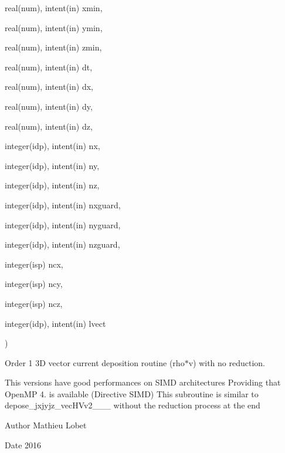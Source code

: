 {\begin{DoxyParamCaption}
\item[{real(num), intent(in)}]{xmin, }
\item[{real(num), intent(in)}]{ymin, }
\item[{real(num), intent(in)}]{zmin, }
\item[{real(num), intent(in)}]{dt, }
\item[{real(num), intent(in)}]{dx, }
\item[{real(num), intent(in)}]{dy, }
\item[{real(num), intent(in)}]{dz, }
\item[{integer(idp), intent(in)}]{nx, }
\item[{integer(idp), intent(in)}]{ny, }
\item[{integer(idp), intent(in)}]{nz, }
\item[{integer(idp), intent(in)}]{nxguard, }
\item[{integer(idp), intent(in)}]{nyguard, }
\item[{integer(idp), intent(in)}]{nzguard, }
\item[{integer(isp)}]{ncx, }
\item[{integer(isp)}]{ncy, }
\item[{integer(isp)}]{ncz, }
\item[{integer(idp), intent(in)}]{lvect}
\end{DoxyParamCaption}
)}\hypertarget{current__deposition_8_f90_a640df01330ec2f2b5ffcb43938a71db5}{}\label{current__deposition_8_f90_a640df01330ec2f2b5ffcb43938a71db5}


Order 1 3D vector current deposition routine (rho$\ast$v) with no reduction. 

This versions have good performances on S\+I\+MD architectures Providing that Open\+MP 4. is available (Directive S\+I\+MD) This subroutine is similar to depose\+\_\+jxjyjz\+\_\+vec\+H\+Vv2\+\_\+\_\+\_ without the reduction process at the end \begin{DoxyAuthor}{Author}
Mathieu Lobet 
\end{DoxyAuthor}
\begin{DoxyDate}{Date}
2016 
\end{DoxyDate}

